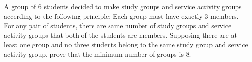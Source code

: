 A group of $6$ students decided to make study groups and service activity groups according to the following
principle:
Each group must have exactly $3$ members. For any pair of students, there are same number of study groups
and service activity groups that both of the students are members.
Supposing there are at least one group and no three students belong to the same study group and service activity group, prove that the minimum number of groups is $8$.